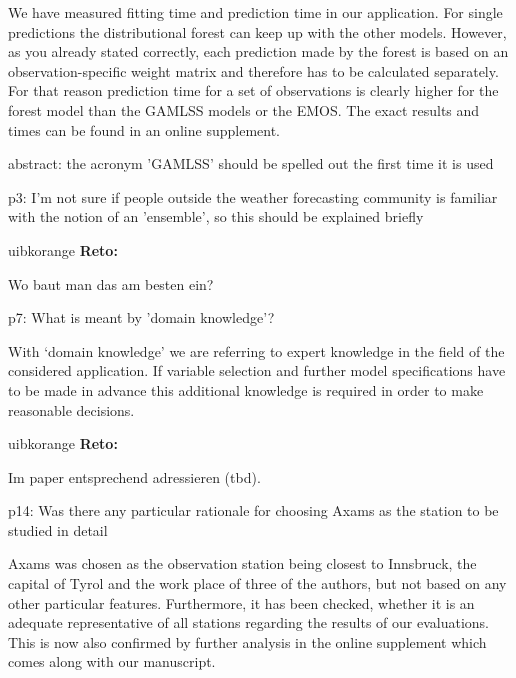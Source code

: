 \documentclass[american,foldmarks=false,noconfig]{uibklttr}
\newenvironment{review}{\fontshape{\itdefault}\fontseries{\bfdefault} \selectfont \smallskip}{\par}
\newenvironment{reto}{
    \begin{color}{uibkorange}
    \textbf{Reto:~}
        \itshape
}{
    \end{color}
}
\begin{document}
We have measured fitting time and prediction time in our 
application. For single predictions the distributional forest 
can keep up with the other models. However, as you already 
stated correctly, each prediction made by the forest is based 
on an observation-specific weight matrix and therefore has to 
be calculated separately. For that reason prediction time for a 
set of observations is clearly higher for the forest model than 
the GAMLSS models or the EMOS. The exact results and times can 
be found in an online supplement.


\begin{review}
abstract: the acronym 'GAMLSS' should be spelled out the first 
time it is used
\end{review}

\begin{review}
p3: I'm not sure if people outside the weather forecasting 
community is familiar with the notion of an 'ensemble', so 
this should be explained briefly
\end{review}

\begin{reto}
Wo baut man das am besten ein?
\end{reto}


\begin{review}
p7: What is meant by 'domain knowledge'?
\end{review}

With `domain knowledge' we are referring to expert knowledge 
in the field of the considered application. 
If variable selection and further model specifications have 
to be made in advance this additional knowledge is required 
in order to make reasonable decisions.

\begin{reto}
Im paper entsprechend adressieren (tbd).
\end{reto}

\begin{review}
p14: Was there any particular rationale for choosing Axams 
as the station to be studied in detail
\end{review}

Axams was chosen as the observation station being closest 
to Innsbruck, the capital of Tyrol and the work place of 
three of the authors, but not based on any other particular 
features. Furthermore, it has been checked, whether it 
is an adequate representative of all stations regarding 
the results of our evaluations. This is now also 
confirmed by further analysis in the online supplement which
comes along with our manuscript.
\end{document}
